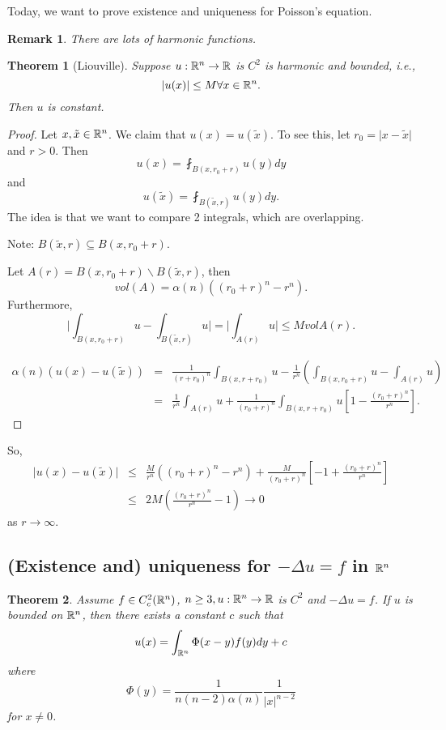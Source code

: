 \documentclass[11pt]{amsart}%
\newtheorem{theorem}{Theorem}
\newtheorem{remark}{Remark}
\begin{document}
Today, we want to prove existence and uniqueness for Poisson's equation.

\begin{remark}
    There are lots of harmonic functions.
\end{remark}

\begin{theorem}[Liouville]
    Suppose $u:\mathbb{R}^n\to\mathbb{R}$ is $C^2$ is harmonic and bounded, i.e.,
    $$\vert u(x)\vert \le M \forall x\in \mathbb{R}^n.$$ Then $u$ is constant.
\end{theorem}

\begin{proof}
    Let $x, \tilde{x}\in \mathbb{R}^n$. We claim that $u(x)=u(\tilde{x})$. To see this, let $r_0=\vert x-\tilde{x}\vert$ and $r>0$. Then
    $$u(x)=\fint_{B(x,r_0+r)}u(y)dy$$ and $$u(\tilde{x})=\fint_{B(\tilde{x},r)}u(y)dy.$$
    The idea is that we want to compare 2 integrals, which are overlapping.
    
    Note: $B(\tilde{x},r)\subseteq B(x,r_0+r)$.
    
    Let $A(r)=B(x,r_0+r)\backslash B(\tilde{x},r)$, then
    $$vol(A)=\alpha(n)((r_0+r)^n-r^n).$$
    Furthermore,
    $$\vert \int_{B(x,r_0+r)} u - \int_{B(\tilde{x},r)} u\vert = \vert \int_{A(r)} u\vert \le M vol A(r).$$
    
    \begin{eqnarray*}
        \alpha(n)(u(x)-u(\tilde{x})) &=&    \frac{1}{(r+r_0)^n}\int_{B(x,r+r_0)} u -\frac{1}{r^n}(\int_{B(x,r_0+r)}u -\int_{A(r)} u)\\
            &=& \frac{1}{r^n}\int_{A(r)} u + \frac{1}{(r_0+r)^n}\int_{B(x,r+r_0)} u [1-\frac{(r_0+r)^n}{r^n}].
    \end{eqnarray*}
\end{proof}

So, 
\begin{eqnarray*}
    \vert u(x)-u(\tilde{x})\vert &\le& \frac{M}{r^n}((r_0+r)^n-r^n) +\frac{M}{(r_0+r)^n}[-1+\frac{(r_0+r)^n}{r^n}]\\ 
            &\le& 2M(\frac{(r_0+r)^n}{r^n}-1)\to 0
\end{eqnarray*}
as $r\to \infty$.

\subsection*{(Existence and) uniqueness for $-\Delta u =f$ in $\mathbb{R}^n$}

\begin{theorem}
    Assume $f\in C^2_c(\mathbb{R}^n)$, $n\ge 3, u:\mathbb{R}^n\to \mathbb{R}$ is $C^2$ and $-\Delta u=f$. If $u$ is bounded on $\mathbb{R}^n$, then there exists a constant $c$ such that
    $$u(x)=\int_{\mathbb{R}^n} \Phi(x-y)f(y)dy+c$$ where $$\Phi(y) =\frac{1}{n(n-2)\alpha(n)}\frac{1}{\vert x\vert^{n-2}}$$ for $x\not=0$.
\end{theorem}
\end{document}
